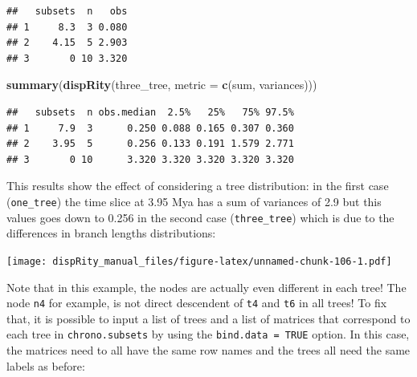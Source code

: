 \documentclass[]{book}
\newenvironment{Shaded}{\begin{snugshade}}{\end{snugshade}}
\newcommand{\ControlFlowTok}[1]{\textcolor[rgb]{0.13,0.29,0.53}{\textbf{#1}}}
\newcommand{\DataTypeTok}[1]{\textcolor[rgb]{0.13,0.29,0.53}{#1}}
\newcommand{\DecValTok}[1]{\textcolor[rgb]{0.00,0.00,0.81}{#1}}
\newcommand{\FloatTok}[1]{\textcolor[rgb]{0.00,0.00,0.81}{#1}}
\newcommand{\KeywordTok}[1]{\textcolor[rgb]{0.13,0.29,0.53}{\textbf{#1}}}
\newcommand{\NormalTok}[1]{#1}
\newcommand{\OperatorTok}[1]{\textcolor[rgb]{0.81,0.36,0.00}{\textbf{#1}}}
\newcommand{\StringTok}[1]{\textcolor[rgb]{0.31,0.60,0.02}{#1}}
\begin{document}
\begin{verbatim}
##   subsets  n   obs
## 1     8.3  3 0.080
## 2    4.15  5 2.903
## 3       0 10 3.320
\end{verbatim}

\begin{Shaded}
\begin{Highlighting}[]
\KeywordTok{summary}\NormalTok{(}\KeywordTok{dispRity}\NormalTok{(three_tree, }\DataTypeTok{metric =} \KeywordTok{c}\NormalTok{(sum, variances)))}
\end{Highlighting}
\end{Shaded}

\begin{verbatim}
##   subsets  n obs.median  2.5%   25%   75% 97.5%
## 1     7.9  3      0.250 0.088 0.165 0.307 0.360
## 2    3.95  5      0.256 0.133 0.191 1.579 2.771
## 3       0 10      3.320 3.320 3.320 3.320 3.320
\end{verbatim}

This results show the effect of considering a tree distribution: in the first case (\texttt{one\_tree}) the time slice at 3.95 Mya has a sum of variances of 2.9 but this values goes down to 0.256 in the second case (\texttt{three\_tree}) which is due to the differences in branch lengths distributions:

\begin{Shaded}
\end{Shaded}

\texttt{[image: dispRity\_manual\_files/figure-latex/unnamed-chunk-106-1.pdf]}

Note that in this example, the nodes are actually even different in each tree! The node \texttt{n4} for example, is not direct descendent of \texttt{t4} and \texttt{t6} in all trees!
To fix that, it is possible to input a list of trees and a list of matrices that correspond to each tree in \texttt{chrono.subsets} by using the \texttt{bind.data\ =\ TRUE} option.
In this case, the matrices need to all have the same row names and the trees all need the same labels as before:
\end{document}
